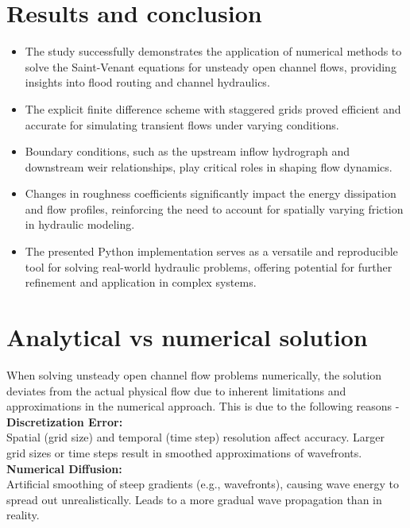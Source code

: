 \documentclass{article}
\begin{document}
\section{Results and conclusion}

\begin{itemize}
    \item The study successfully demonstrates the application of numerical methods to solve the Saint-Venant equations for unsteady open channel flows, providing insights into flood routing and channel hydraulics.
    \item The explicit finite difference scheme with staggered grids proved efficient and accurate for simulating transient flows under varying conditions.
    \item Boundary conditions, such as the upstream inflow hydrograph and downstream weir relationships, play critical roles in shaping flow dynamics.
    \item Changes in roughness coefficients significantly impact the energy dissipation and flow profiles, reinforcing the need to account for spatially varying friction in hydraulic modeling.
    \item The presented Python implementation serves as a versatile and reproducible tool for solving real-world hydraulic problems, offering potential for further refinement and application in complex systems.
\end{itemize}

\section{Analytical vs numerical solution}

When solving unsteady open channel flow problems numerically, the solution deviates from the actual physical flow due to inherent limitations and approximations in the numerical approach.
This is due to the following reasons - \\

\noindent
\textbf{Discretization Error:}\\
Spatial (grid size) and temporal (time step) resolution affect accuracy.
Larger grid sizes or time steps result in smoothed approximations of wavefronts.\\

\noindent
\textbf{Numerical Diffusion:}\\
Artificial smoothing of steep gradients (e.g., wavefronts), causing wave energy to spread out unrealistically.
Leads to a more gradual wave propagation than in reality.\\
\end{document}
